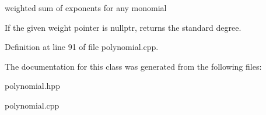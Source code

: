 weighted sum of exponents for any monomial 

If the given weight pointer is {\ttfamily nullptr}, returns the standard degree. 

Definition at line 91 of file polynomial.\+cpp.



The documentation for this class was generated from the following files\+:\begin{DoxyCompactItemize}
\item 
polynomial.\+hpp\item 
polynomial.\+cpp\end{DoxyCompactItemize}
